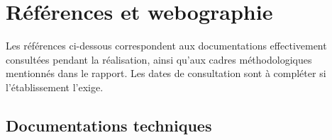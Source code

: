 \chapter{Références et webographie}
\label{ann:references}

Les références ci-dessous correspondent aux documentations effectivement consultées
pendant la réalisation, ainsi qu'aux cadres méthodologiques mentionnés dans le rapport.
Les dates de consultation sont à compléter si l'établissement l'exige.

\section*{Documentations techniques}

